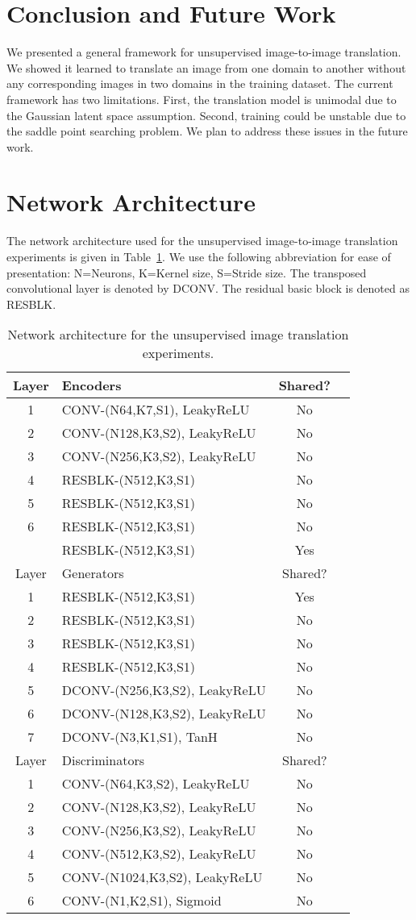 \documentclass{article}
\begin{document}
\section{Conclusion and Future Work}

We presented a general framework for unsupervised image-to-image translation. We showed it learned to translate an image from one domain to another without any corresponding images in two domains in the training dataset. The current framework has two limitations. First, the translation model is unimodal due to the Gaussian latent space assumption. Second, training could be unstable due to the saddle point searching problem. We plan to address these issues in the future work. 
{\small


}
\appendix
\clearpage
\section{Network Architecture}\label{app::network}

The network architecture used for the unsupervised image-to-image translation experiments is given in Table~\ref{tbl::arch}. We use the following abbreviation for ease of presentation: N=Neurons, K=Kernel size, S=Stride size. The transposed convolutional layer is denoted by DCONV. The residual basic block is denoted as RESBLK. 

\begin{table}[tbh!]
\caption{\small Network architecture for the unsupervised image translation experiments.}
\label{tbl::arch}
\small
\centering
\begin{tabularx}{265pt}{clcc}
\toprule
Layer &  Encoders & Shared? \tabularnewline\midrule
1 & CONV-(N64,K7,S1), LeakyReLU &No\tabularnewline
2 & CONV-(N128,K3,S2), LeakyReLU  &No\tabularnewline
3 & CONV-(N256,K3,S2), LeakyReLU  &No\tabularnewline
4 & RESBLK-(N512,K3,S1) &No\tabularnewline
5 & RESBLK-(N512,K3,S1) &No\tabularnewline
6 & RESBLK-(N512,K3,S1) &No\tabularnewline
 & RESBLK-(N512,K3,S1) &Yes\tabularnewline\midrule
Layer &  Generators & Shared?\tabularnewline\midrule
1 & RESBLK-(N512,K3,S1) &Yes\tabularnewline
2 & RESBLK-(N512,K3,S1) &No\tabularnewline
3 & RESBLK-(N512,K3,S1) &No\tabularnewline
4 & RESBLK-(N512,K3,S1) &No\tabularnewline
5 &  DCONV-(N256,K3,S2), LeakyReLU &No\tabularnewline
6 &  DCONV-(N128,K3,S2), LeakyReLU &No\tabularnewline
7 &  DCONV-(N3,K1,S1), TanH & No\tabularnewline\midrule
Layer &  Discriminators & Shared? \tabularnewline\midrule
1 & CONV-(N64,K3,S2), LeakyReLU &No\tabularnewline
2 & CONV-(N128,K3,S2), LeakyReLU  &No\tabularnewline
3 & CONV-(N256,K3,S2), LeakyReLU  &No\tabularnewline
4 & CONV-(N512,K3,S2), LeakyReLU  &No\tabularnewline
5 & CONV-(N1024,K3,S2), LeakyReLU  &No\tabularnewline
6 & CONV-(N1,K2,S1), Sigmoid &No\tabularnewline\bottomrule
\end{tabularx}
\end{table}
\end{document}
